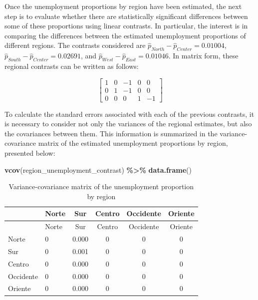 \documentclass[
  english,
  12pt,
]{book}
\newenvironment{Shaded}{\begin{snugshade}}{\end{snugshade}}
\newcommand{\FunctionTok}[1]{\textcolor[rgb]{0.13,0.29,0.53}{\textbf{#1}}}
\newcommand{\NormalTok}[1]{#1}
\newcommand{\SpecialCharTok}[1]{\textcolor[rgb]{0.81,0.36,0.00}{\textbf{#1}}}
\begin{document}
Once the unemployment proportions by region have been estimated, the next step is to evaluate whether there are statistically significant differences between some of these proportions using linear contrasts. In particular, the interest is in comparing the differences between the estimated unemployment proportions of different regions. The contrasts considered are \(\hat{p}_{North} - \hat{p}_{Center} = 0.01004\), \(\hat{p}_{South} - \hat{p}_{Center} = 0.02691\), and \(\hat{p}_{West} - \hat{p}_{East} = 0.01046\). In matrix form, these regional contrasts can be written as follows:

\[
\left[\begin{array}{ccccc}
1 & 0 & -1 & 0 & 0\\
0 & 1 & -1 & 0 & 0\\
0 & 0 & 0 & 1 & -1
\end{array}\right]
\]

To calculate the standard errors associated with each of the previous contrasts, it is necessary to consider not only the variances of the regional estimates, but also the covariances between them. This information is summarized in the variance-covariance matrix of the estimated unemployment proportions by region, presented below:

\begin{Shaded}
\begin{Highlighting}[]
\FunctionTok{vcov}\NormalTok{(region\_unemployment\_contrast) }\SpecialCharTok{\%\textgreater{}\%}
  \FunctionTok{data.frame}\NormalTok{()}
\end{Highlighting}
\end{Shaded}

\begin{longtable}[]{@{}llcccc@{}}
\caption{\label{tab:tab-vcov-desempleo-region}Variance-covariance matrix of the unemployment proportion by region}\tabularnewline
\toprule\noalign{}
& Norte & Sur & Centro & Occidente & Oriente \\
\midrule\noalign{}
\endfirsthead
\toprule\noalign{}
& Norte & Sur & Centro & Occidente & Oriente \\
\midrule\noalign{}
\endhead
\bottomrule\noalign{}
\endlastfoot
Norte & 0 & 0.000 & 0 & 0 & 0 \\
Sur & 0 & 0.001 & 0 & 0 & 0 \\
Centro & 0 & 0.000 & 0 & 0 & 0 \\
Occidente & 0 & 0.000 & 0 & 0 & 0 \\
Oriente & 0 & 0.000 & 0 & 0 & 0 \\
\end{longtable}
\end{document}
